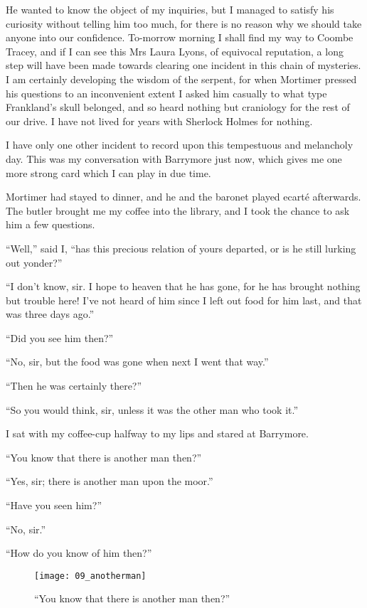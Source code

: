 He wanted to know the object of my inquiries, but I managed to satisfy his curiosity without telling him too much, for there is no reason why we should take anyone into our confidence. To-morrow morning I shall find my way to Coombe Tracey, and if I can see this Mrs Laura Lyons, of equivocal reputation, a long step will have been made towards clearing one incident in this chain of mysteries. I am certainly developing the wisdom of the serpent, for when Mortimer pressed his questions to an inconvenient extent I asked him casually to what type Frankland's skull belonged, and so heard nothing but craniology for the rest of our drive. I have not lived for years with Sherlock Holmes for nothing.

I have only one other incident to record upon this tempestuous and melancholy day. This was my conversation with Barrymore just now, which gives me one more strong card which I can play in due time.

Mortimer had stayed to dinner, and he and the baronet played ecarté afterwards. The butler brought me my coffee into the library, and I took the chance to ask him a few questions.

\enquote{Well,} said I, \enquote{has this precious relation of yours departed, or is he still lurking out yonder?}

\enquote{I don't know, sir. I hope to heaven that he has gone, for he has brought nothing but trouble here! I've not heard of him since I left out food for him last, and that was three days ago.}

\enquote{Did you see him then?}

\enquote{No, sir, but the food was gone when next I went that way.}

\enquote{Then he was certainly there?}

\enquote{So you would think, sir, unless it was the other man who took it.}

I sat with my coffee-cup halfway to my lips and stared at Barrymore.

\enquote{You know that there is another man then?}

\enquote{Yes, sir; there is another man upon the moor.}

\enquote{Have you seen him?}

\enquote{No, sir.}

\enquote{How do you know of him then?}

\begin{figure}[tbh]
\centering
\texttt{[image: 09\_anotherman]}
\caption{\enquote{You know that there is another man then?}}
\end{figure}

